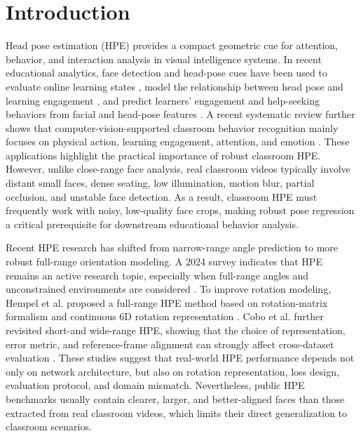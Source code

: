 \documentclass[preprint,12pt]{elsarticle}
\begin{document}
\section{Introduction}
Head pose estimation (HPE) provides a compact geometric cue for attention, behavior, and interaction analysis in visual intelligence systems. In recent educational analytics, face detection and head-pose cues have been used to evaluate online learning states \cite{li2024online}, model the relationship between head pose and learning engagement \cite{zheng2025lightnet}, and predict learners' engagement and help-seeking behaviors from facial and head-pose features \cite{wang2025engagement}. A recent systematic review further shows that computer-vision-supported classroom behavior recognition mainly focuses on physical action, learning engagement, attention, and emotion \cite{liu2025classroomreview}. These applications highlight the practical importance of robust classroom HPE. However, unlike close-range face analysis, real classroom videos typically involve distant small faces, dense seating, low illumination, motion blur, partial occlusion, and unstable face detection. As a result, classroom HPE must frequently work with noisy, low-quality face crops, making robust pose regression a critical prerequisite for downstream educational behavior analysis.

Recent HPE research has shifted from narrow-range angle prediction to more robust full-range orientation modeling. A 2024 survey indicates that HPE remains an active research topic, especially when full-range angles and unconstrained environments are considered \cite{algabri2024survey}. To improve rotation modeling, Hempel et al. proposed a full-range HPE method based on rotation-matrix formalism and continuous 6D rotation representation \cite{hempel2024tip}. Cobo et al. further revisited short-and wide-range HPE, showing that the choice of representation, error metric, and reference-frame alignment can strongly affect cross-dataset evaluation \cite{cobo2024pr}. These studies suggest that real-world HPE performance depends not only on network architecture, but also on rotation representation, loss design, evaluation protocol, and domain mismatch. Nevertheless, public HPE benchmarks usually contain clearer, larger, and better-aligned faces than those extracted from real classroom videos, which limits their direct generalization to classroom scenarios.
\end{document}
